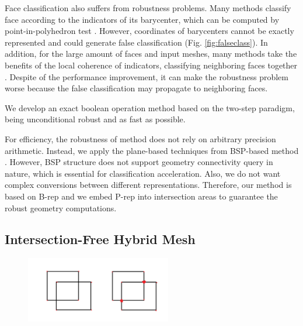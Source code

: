 \documentclass[10pt,journal,compsoc]{IEEEtran}
\begin{document}
Face classification also suffers from robustness problems. Many methods classify face according to the indicators of its barycenter, which can be computed by point-in-polyhedron test \cite{feito2013fast,campen2010exact}. However, coordinates of barycenters cannot be exactly represented and could generate false classification (Fig. \ref{fig:falseclass}). In addition, for the large amount of faces and input meshes, many methods take the benefits of the local coherence of indicators, classifying neighboring faces together \cite{pavic2010hybrid,feito2013fast,ogayar2015deferred,zhou2016mesh}. Despite of the performance improvement, it can make the robustness problem worse because the false classification may propagate to neighboring faces.

We develop an exact boolean operation method based on the two-step paradigm, being unconditional robust and as fast as possible.

For efficiency, the robustness of method does not rely on arbitrary precision arithmetic. Instead, we apply the plane-based techniques from BSP-based method \cite{campen2010exact}. However, BSP structure does not support geometry connectivity query in nature, which is essential for classification acceleration. Also, we do not want complex conversions between different representations. Therefore, our method is based on B-rep and we embed P-rep into intersection areas to guarantee the robust geometry computations.


\iffalse
\subsection{Intersection-Free Hybrid Mesh}

\begin{figure}[t]
\centering
\includegraphics[width=2.5in]{linkedhalfedge}
\caption{{\color{red}{Sketch: The Linked Halfedge structure}}}
\label{fig:linkedhalfedge}
\end{figure}
\end{document}
